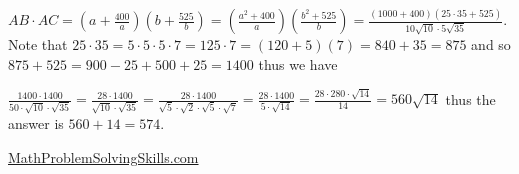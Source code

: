 \begin{enumerate}
 $AB \cdot AC = (a + \frac{400}{a})(b + \frac{525}{b}) = (\frac{a^2 + 400}{a})(\frac{b^2 + 525}{b}) = \frac{(1000 + 400)(25 \cdot 35 + 525)}{10\sqrt{10} \cdot 5\sqrt{35}}$. Note that $25 \cdot 35 = 5 \cdot 5 \cdot 5 \cdot 7 = 125 \cdot 7 = (120 + 5)(7) = 840 + 35 = 875$ and so $875 + 525 = 900 - 25 + 500 + 25 = 1400$ thus we have

 $\frac{1400 \cdot 1400}{50 \cdot \sqrt{10} \cdot \sqrt{35}} = \frac{28 \cdot 1400}{\sqrt{10} \cdot \sqrt{35}} = \frac{28 \cdot 1400}{\sqrt{5} \cdot \sqrt{2} \cdot \sqrt{5} \cdot \sqrt{7}} = \frac{28 \cdot 1400}{5 \cdot \sqrt{14}} = \frac{28 \cdot 280 \cdot \sqrt{14}}{14} = 560\sqrt{14}$ thus the answer is $560 + 14 = \boxed{574}$.

 \href{https://mathproblemsolvingskills.wordpress.com/}{MathProblemSolvingSkills.com}

 


 


 


\end{enumerate}